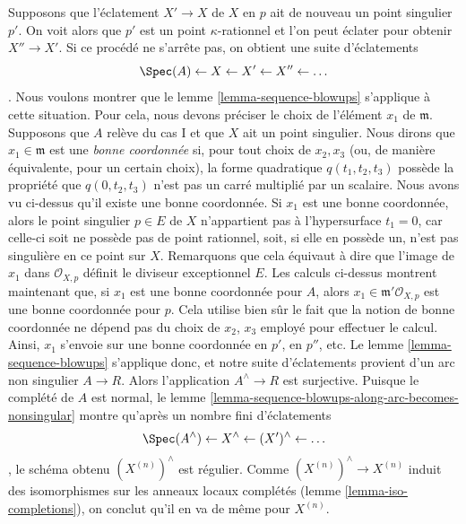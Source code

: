 \medskip\noindent Supposons que l'éclatement $X' \to X$ de $X$ en $p$ ait de nouveau un point singulier $p'$. On voit alors que $p'$ est un point $\kappa$-rationnel et l'on peut éclater pour obtenir $X'' \to X'$. Si ce procédé ne s'arrête pas, on obtient une suite d'éclatements $$
\Spec(A) \leftarrow X \leftarrow X' \leftarrow X'' \leftarrow \ldots
$$. Nous voulons montrer que le lemme \ref{lemma-sequence-blowups} s'applique à cette situation. Pour cela, nous devons préciser le choix de l'élément $x_1$ de $\mathfrak m$. Supposons que $A$ relève du cas I et que $X$ ait un point singulier. Nous dirons que $x_1 \in \mathfrak m$ est une {\it bonne coordonnée} si, pour tout choix de $x_2, x_3$ (ou, de manière équivalente, pour un certain choix), la forme quadratique $q(t_1, t_2, t_3)$ possède la propriété que $q(0, t_2, t_3)$ n'est pas un carré multiplié par un scalaire. Nous avons vu ci-dessus qu'il existe une bonne coordonnée. Si $x_1$ est une bonne coordonnée, alors le point singulier $p \in E$ de $X$ n'appartient pas à l'hypersurface $t_1 = 0$, car celle-ci soit ne possède pas de point rationnel, soit, si elle en possède un, n'est pas singulière en ce point sur $X$. Remarquons que cela équivaut à dire que l'image de $x_1$ dans $\mathcal{O}_{X, p}$ définit le diviseur exceptionnel $E$. Les calculs ci-dessus montrent maintenant que, si $x_1$ est une bonne coordonnée pour $A$, alors $x_1 \in \mathfrak m'\mathcal{O}_{X, p}$ est une bonne coordonnée pour $p$. Cela utilise bien sûr le fait que la notion de bonne coordonnée ne dépend pas du choix de $x_2$, $x_3$ employé pour effectuer le calcul. Ainsi, $x_1$ s'envoie sur une bonne coordonnée en $p'$, en $p''$, etc. Le lemme \ref{lemma-sequence-blowups} s'applique donc, et notre suite d'éclatements provient d'un arc non singulier $A \to R$. Alors l'application $A^\wedge \to R$ est surjective. Puisque le complété de $A$ est normal, le lemme \ref{lemma-sequence-blowups-along-arc-becomes-nonsingular} montre qu'après un nombre fini d'éclatements $$
\Spec(A^\wedge) \leftarrow X^\wedge \leftarrow (X')^\wedge \leftarrow \ldots
$$, le schéma obtenu $(X^{(n)})^\wedge$ est régulier. Comme $(X^{(n)})^\wedge \to X^{(n)}$ induit des isomorphismes sur les anneaux locaux complétés (lemme \ref{lemma-iso-completions}), on conclut qu'il en va de même pour $X^{(n)}$.


